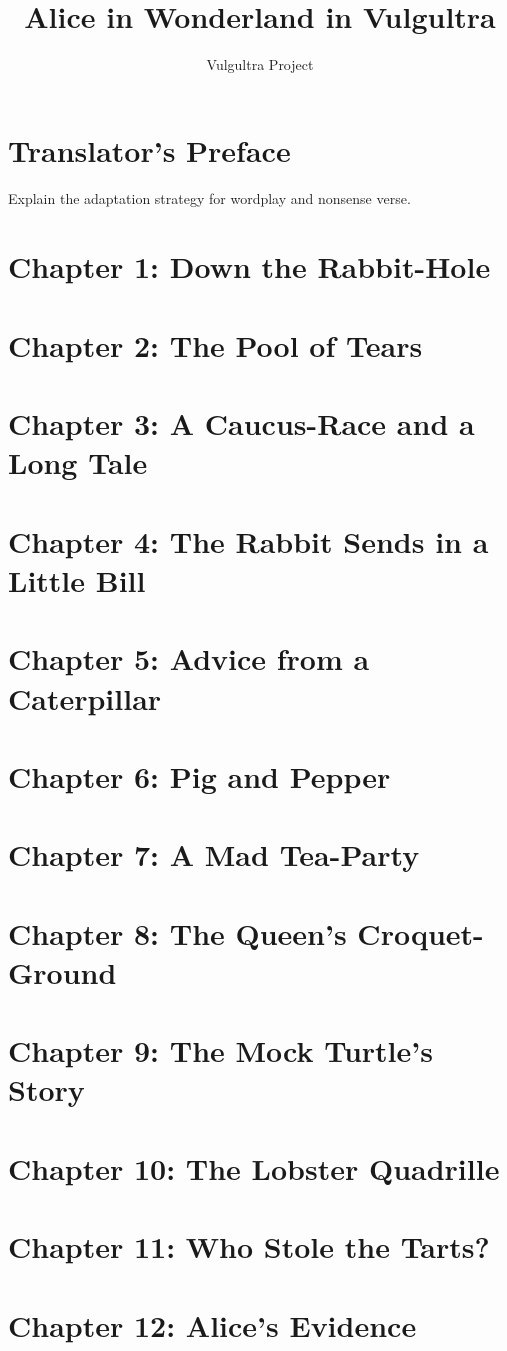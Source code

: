 \documentclass[12pt]{book}
\title{Alice in Wonderland in Vulgultra}
\author{Vulgultra Project}
\date{}
\begin{document}
\maketitle
\tableofcontents

\chapter{Translator's Preface}
Explain the adaptation strategy for wordplay and nonsense verse.

\chapter{Chapter 1: Down the Rabbit-Hole}
\chapter{Chapter 2: The Pool of Tears}
\chapter{Chapter 3: A Caucus-Race and a Long Tale}
\chapter{Chapter 4: The Rabbit Sends in a Little Bill}
\chapter{Chapter 5: Advice from a Caterpillar}
\chapter{Chapter 6: Pig and Pepper}
\chapter{Chapter 7: A Mad Tea-Party}
\chapter{Chapter 8: The Queen's Croquet-Ground}
\chapter{Chapter 9: The Mock Turtle's Story}
\chapter{Chapter 10: The Lobster Quadrille}
\chapter{Chapter 11: Who Stole the Tarts?}
\chapter{Chapter 12: Alice's Evidence}
\end{document}

